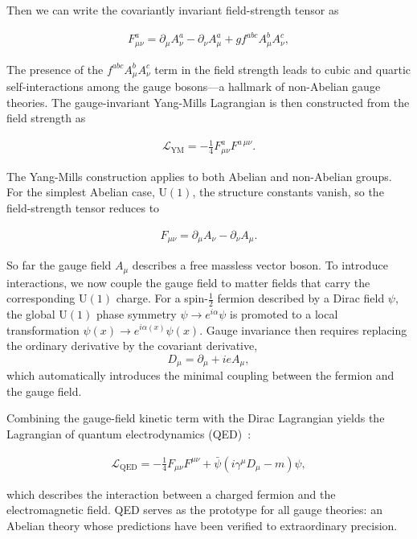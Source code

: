 Then we can write the covariantly invariant field-strength tensor as

\begin{align}
    F_{\mu\nu}^a
    = \partial_\mu A_\nu^a 
    - \partial_\nu A_\mu^a
    + g f^{abc} A_\mu^b A_\nu^c,
\end{align}

The presence of the $f^{abc} A_\mu^b A_\nu^c$ term in the field strength leads to cubic and quartic self-interactions among the gauge bosons—a hallmark of non-Abelian gauge theories. 
The gauge-invariant Yang-Mills Lagrangian is then constructed from the field strength as~\cite{YangMills1954}

\begin{align}
\mathcal{L}_{\mathrm{YM}}
    = -\frac{1}{4} F_{\mu\nu}^a F^{a\,\mu\nu}.
\end{align}\label{Yang-Mills}

The Yang-Mills construction applies to both Abelian and non-Abelian groups. For the simplest Abelian case, $\mathrm{U}(1)$, the structure constants vanish, so the field-strength tensor reduces to

\begin{align}
    F_{\mu\nu}
    = \partial_\mu A_\nu - \partial_\nu A_\mu .
\end{align}

So far the gauge field $A_\mu$ describes a free massless vector boson. To introduce interactions, we now couple the gauge field to matter fields that carry the corresponding $\mathrm{U}(1)$ charge.
For a spin-$\tfrac{1}{2}$ fermion described by a Dirac field $\psi$, the global $\mathrm{U}(1)$ phase symmetry $\psi \to e^{i\alpha}\psi$ is promoted to a local transformation
$\psi(x)\to e^{i\alpha(x)}\psi(x)$.
Gauge invariance then requires replacing the ordinary derivative by the covariant derivative,
\[
    D_\mu = \partial_\mu + i e A_\mu,
\]
which automatically introduces the minimal coupling between the fermion and the gauge field.

Combining the gauge-field kinetic term with the Dirac Lagrangian yields the Lagrangian of quantum electrodynamics (QED)~\cite{Dirac1928,Schwinger1948,Feynman1949}:

\begin{align}
\mathcal{L}_{\mathrm{QED}}
= -\frac14 F_{\mu\nu} F^{\mu\nu}
  + \bar{\psi} (i\gamma^\mu D_\mu - m ) \psi,
\end{align}

which describes the interaction between a charged fermion and the electromagnetic field.
QED serves as the prototype for all gauge theories: an Abelian theory whose predictions have been verified to extraordinary precision.

